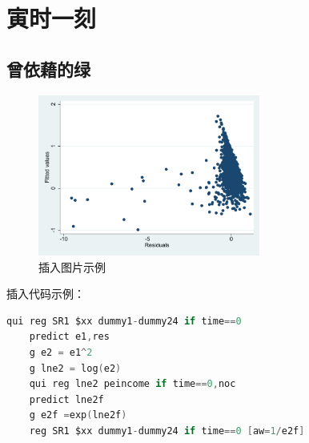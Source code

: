 \documentclass[a4paper,12pt]{report}
\begin{document}
\chapter{寅时一刻}
\section{曾依藉的绿}
\begin{figure}[H]
    \centering
    \includegraphics[width=0.65\textwidth]{figure/cancha.pdf}
    \caption{插入图片示例}
\end{figure}


插入代码示例：
\begin{lstlisting}[language=C]
    qui reg SR1 $xx dummy1-dummy24 if time==0
    predict e1,res
    g e2 = e1^2
    g lne2 = log(e2)
    qui reg lne2 peincome if time==0,noc
    predict lne2f
    g e2f =exp(lne2f)
    reg SR1 $xx dummy1-dummy24 if time==0 [aw=1/e2f]
\end{lstlisting}



\printbibliography
\end{document}
